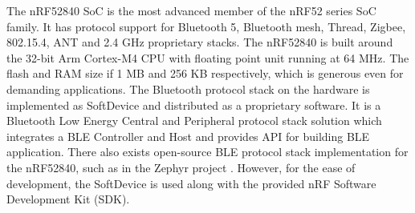\justify
The nRF52840 SoC is the most advanced member of the nRF52 series SoC family.
It has protocol support for Bluetooth 5, Bluetooth mesh, Thread, Zigbee, 
802.15.4, ANT and 2.4 GHz proprietary stacks. The nRF52840 is built around the 
32-bit Arm Cortex-M4 CPU with floating point unit running at 64 MHz. The flash and 
RAM size if 1 MB and 256 KB respectively, which is generous even for demanding 
applications. \cite{nrf19}
\justify
The Bluetooth protocol stack on the hardware is implemented as SoftDevice and 
distributed as a proprietary software. It is a Bluetooth Low Energy Central 
and Peripheral protocol stack solution which integrates a BLE Controller and 
Host and provides API for building BLE application. There also exists open-source BLE 
protocol stack implementation for the nRF52840, such as in the Zephyr project 
\cite{zep19}. However, for the ease of development, the SoftDevice is used along
with the provided nRF Software Development Kit (SDK).